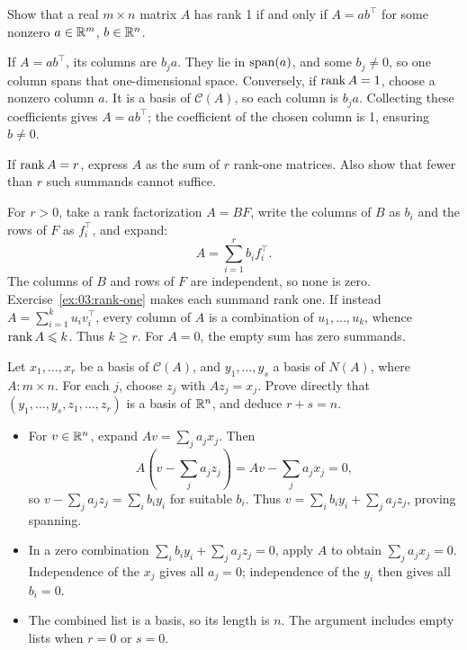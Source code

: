 \begin{problem}\label{ex:03:rank-one}
Show that a real \(m\times n\) matrix \(A\) has rank 1 if and only if
\(A=ab^\top\) for some nonzero \(a\in\mathbb R^m\), \(b\in\mathbb R^n\).
\end{problem}
\begin{solution}
If \(A=ab^\top\), its columns are \(b_ja\). They lie in \(\operatorname{span}(a)\),
and some \(b_j\ne0\), so one column spans that one-dimensional space.
Conversely, if \(\operatorname{rank} A=1\), choose a nonzero column \(a\).
It is a basis of \(\mathcal C(A)\), so each column is \(b_ja\).
Collecting these coefficients gives \(A=ab^\top\); the coefficient of
the chosen column is 1, ensuring \(b\ne0\).
\end{solution}

\begin{problem}\label{ex:03:outer-sum}
If \(\operatorname{rank} A=r\), express \(A\) as the sum of \(r\) rank-one matrices.
Also show that fewer than \(r\) such summands cannot suffice.
\end{problem}
\begin{solution}
For \(r>0\), take a rank factorization \(A=BF\), write the columns of
\(B\) as \(b_i\) and the rows of \(F\) as \(f_i^\top\), and expand:
\[
A=\sum_{i=1}^r b_if_i^\top.
\]
The columns of \(B\) and rows of \(F\) are independent, so none is zero.
Exercise~\ref{ex:03:rank-one} makes each summand rank one.
If instead \(A=\sum_{i=1}^k u_iv_i^\top\), every column of \(A\)
is a combination of \(u_1,\ldots,u_k\), whence \(\operatorname{rank} A\leqslant k\).
Thus \(k\geqslant r\). For \(A=0\), the empty sum has zero summands.
\end{solution}

\begin{problem}\label{ex:03:lifted-basis}
Let \(x_1,\ldots,x_r\) be a basis of \(\mathcal C(A)\), and
\(y_1,\ldots,y_s\) a basis of \(N(A)\), where \(A:m\times n\).
For each \(j\), choose \(z_j\) with \(Az_j=x_j\).
Prove directly that \((y_1,\ldots,y_s,z_1,\ldots,z_r)\) is a basis of
\(\mathbb R^n\), and deduce \(r+s=n\).
\end{problem}
\begin{solution}
\begin{itemize}
\item For \(v\in\mathbb R^n\), expand \(Av=\sum_j a_jx_j\).
Then
\[
A\left(v-\sum_j a_jz_j\right)=Av-\sum_j a_jx_j=0,
\]
so \(v-\sum_j a_jz_j=\sum_i b_iy_i\) for suitable \(b_i\).
Thus \(v=\sum_i b_iy_i+\sum_j a_jz_j\), proving spanning.
\item In a zero combination
\(\sum_i b_iy_i+\sum_j a_jz_j=0\), apply \(A\) to obtain
\(\sum_j a_jx_j=0\). Independence of the \(x_j\) gives all \(a_j=0\);
independence of the \(y_i\) then gives all \(b_i=0\).
\item The combined list is a basis, so its length is \(n\).
The argument includes empty lists when \(r=0\) or \(s=0\).
\end{itemize}
\end{solution}

